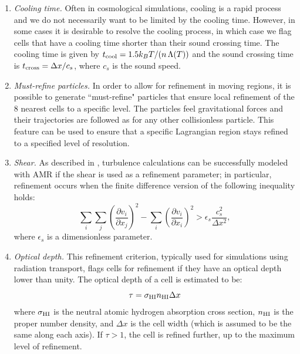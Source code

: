\begin{enumerate}
\item{\em Cooling time.}  Often in cosmological simulations, cooling is a rapid process and we do not necessarily want to be limited by the cooling time.  However, in some cases it is desirable to resolve the cooling process, in which case we flag cells that have a cooling time shorter than their sound crossing time.  The cooling time is given by $t_{\rm cool} = 1.5 k_BT / (n\, \Lambda(T))$ and the sound crossing time is $t_{\rm cross} = \Delta x / c_s$, where $c_s$ is the sound speed.

\item{\em Must-refine particles.}  In order to allow for refinement in moving regions, it is possible to generate ``must-refine" particles that ensure local refinement of the 8 nearest cells to a specific level.  The particles feel gravitational forces and their trajectories are followed as for any other collisionless particle.  This feature can be used to ensure that a specific Lagrangian region stays refined to a specified level of resolution. 

\item{\em Shear.} As described in \citet{Kritsuk06}, turbulence calculations can be successfully modeled with AMR if the shear is used as a refinement parameter; in particular, refinement occurs when the finite difference version of the following inequality holds:
\begin{equation}
\sum_i \sum_j \left( \frac{\partial v_i}{\partial x_j} \right)^2 -  \sum_i \left( \frac{\partial v_i}{\partial x_i} \right)^2
> \epsilon_s \frac{c_s^2}{\Delta x^2},
\end{equation}
where $\epsilon_s$ is a dimensionless parameter.

\item{\em Optical depth.} This refinement criterion, typically used for simulations using radiation transport, 
flags cells for refinement if they have an  optical depth lower than unity.  The optical depth of a cell is estimated to be:
\begin{equation}
\tau = \sigma_{\rm HI} n_{\rm HI} \Delta x 
\end{equation}
where $\sigma_{\rm HI}$ is the neutral atomic hydrogen absorption
cross section, $n_{\rm HI}$ is the proper  number density,
and $\Delta x$ is the cell width (which is assumed to be the same along each axis).  If $\tau > 1$, the cell is refined
further, up to the maximum level of refinement.


\end{enumerate}
